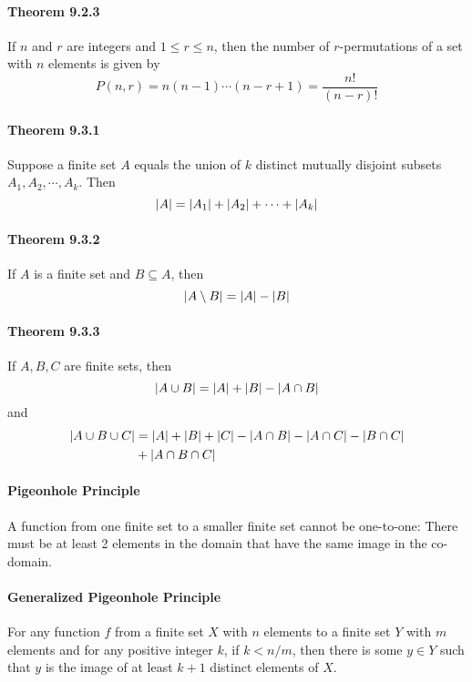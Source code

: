 \documentclass[a4paper]{article}
\begin{document}
\begin{multicols*}{3}
    \paragraph{Theorem 9.2.3} If $n$ and $r$ are integers and $1 \leq r \leq n$, then the number of $r$-permutations of a set with $n$ elements is given by
    \begin{equation*}
      P(n,r) = n(n-1)\cdots(n-r+1) = \dfrac{n!}{(n-r)!}
    \end{equation*}
    \paragraph{Theorem 9.3.1} Suppose a finite set $A$ equals the union of $k$ distinct mutually disjoint subsets $A_1, A_2, \cdots, A_k$. Then 
      \begin{equation*}
        \left\lvert A\right\rvert = \left\lvert A_1\right\rvert + \left\lvert A_2\right\rvert + \cdots + \left\lvert A_k\right\rvert
      \end{equation*}
      \paragraph{Theorem 9.3.2} If $A$ is a finite set and $B \subseteq A$, then
        \begin{equation*}
          \left\lvert A \setminus B\right\rvert = \left\lvert A\right\rvert - \left\lvert B\right\rvert
        \end{equation*}
    \paragraph{Theorem 9.3.3} If $A,B,C$ are finite sets, then
      \begin{equation*}
        \left\lvert A \cup B\right\rvert = \left\lvert A\right\rvert + \left\lvert B\right\rvert - \left\lvert A \cap B\right\rvert
      \end{equation*}
      and
      \begin{align*}
        \left\lvert A \cup B \cup C\right\rvert &= \left\lvert A\right\rvert + \left\lvert B\right\rvert + \left\lvert C\right\rvert - \left\lvert A \cap B\right\rvert - \left\lvert A \cap C\right\rvert - \left\lvert B \cap C\right\rvert \\
        &+ \left\lvert A \cap B \cap C\right\rvert
      \end{align*}
    \paragraph{Pigeonhole Principle} A function from one finite set to a smaller finite set cannot be one-to-one: There must be at least 2 elements in the domain that have the same image in the co-domain.
    \paragraph{Generalized Pigeonhole Principle} For any function $f$ from a finite set $X$ with $n$ elements to a finite set $Y$ with $m$ elements and for any positive integer $k$, if $k < n/m$, then there is some $y \in Y$ such that $y$ is the image of at least $k+1$ distinct elements of $X$.

\end{multicols*}
\end{document}
